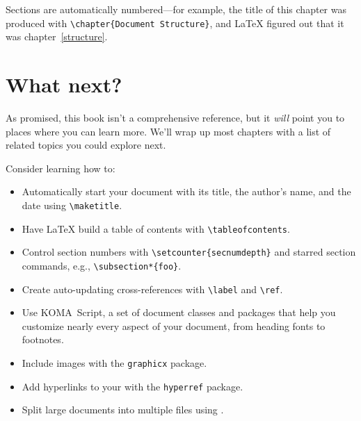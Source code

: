 Sections are automatically numbered---for example,
the title of this chapter was produced with \verb|\chapter{Document Structure}|,
and \LaTeX{} figured out that it was chapter~\ref{structure}.

\section{What next?}

As promised, this book isn't a comprehensive reference,
but it \emph{will} point you to places where you can learn more.
We'll wrap up most chapters with a list of related topics you could
explore next.

Consider learning how to:
\begin{itemize}
\item Automatically start your document with its title, the author's name,
    and the date using \verb|\maketitle|.
\item Have \LaTeX{} build a table of contents
    with \verb|\tableofcontents|.
\item Control section numbers with \verb|\setcounter{secnumdepth}|
and starred section commands, e.g., \verb|\subsection*{foo}|.
\item Create auto-updating cross-references with \verb|\label| and \verb|\ref|.
\item Use KOMA~Script, a set of document classes and packages
that help you customize nearly every aspect of your document,
from heading fonts to footnotes.
\item Include images with the \texttt{graphicx} package.
\item Add hyperlinks to your  with the \texttt{hyperref} package.
\item Split large documents into multiple files using \verb||.
\end{itemize}

